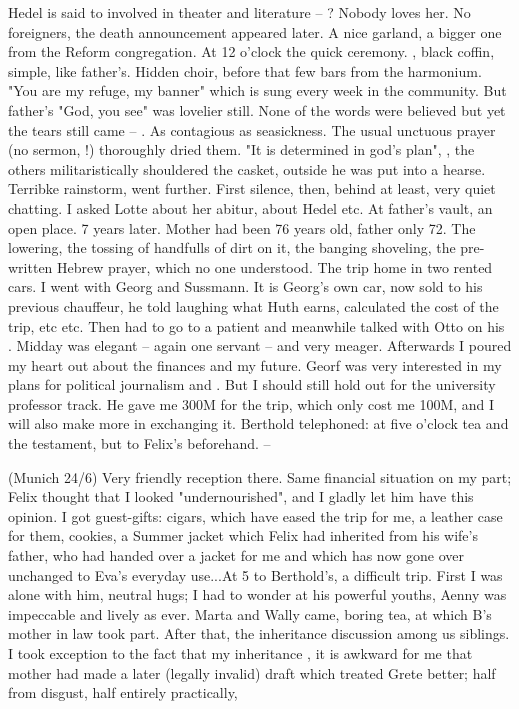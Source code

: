 Hedel is said to involved in theater and literature -- ? Nobody loves her. No foreigners, the death announcement appeared later. A nice garland, a bigger one from the Reform congregation. At 12 o'clock the quick ceremony. , black coffin, simple, like father's. Hidden choir, before that few bars from the harmonium. "You are my refuge, my banner" which is sung every week in the community. But father's "God, you see" was lovelier still. None of the words were believed but yet the tears still came -- . As contagious as seasickness. The usual unctuous prayer (no sermon, !) thoroughly dried them. "It is determined in god's plan", , the others militaristically shouldered the casket, outside he was put into a hearse. Terribke rainstorm, went further. First silence, then, behind at least, very quiet chatting. I asked Lotte about her abitur, about Hedel etc. At father's vault, an open place. 7 years later. Mother had been 76 years old, father only 72. The lowering, the tossing of handfulls of dirt on it, the banging shoveling, the pre-written Hebrew prayer, which no one understood. The trip home in two rented cars. I went with Georg and Sussmann. It is Georg's own car, now sold to his previous chauffeur, he told laughing what Huth earns, calculated the cost of the trip, etc etc. Then had to go to a patient and meanwhile talked with Otto on his . Midday was elegant -- again one servant -- and very meager. Afterwards I poured my heart out about the finances and my future. Georf was very interested in my plans for political journalism and . But I should still hold out for the university professor track. He gave me 300M for the trip, which only cost me 100M, and I will also make more in exchanging it. Berthold telephoned: at five o'clock tea and the testament, but to Felix's beforehand. --

(Munich 24/6) Very friendly reception there. Same financial situation on my part; Felix thought that I looked "undernourished", and I gladly let him have this opinion. I got guest-gifts: cigars, which have eased the trip for me, a leather case for them, cookies, a Summer jacket which Felix had inherited from his wife's father, who had handed over a jacket for me and which has now gone over unchanged to Eva's everyday use...At 5 to Berthold's, a difficult trip. First I was alone with him, neutral hugs; I had to wonder at his powerful youths, Aenny was impeccable and lively as ever. Marta and Wally came, boring tea, at which B's mother in law took part. After that, the inheritance discussion among us siblings. I took exception to the fact that my inheritance , it is awkward for me that mother had made a later (legally invalid) draft which treated Grete better; half from disgust, half entirely practically, 

